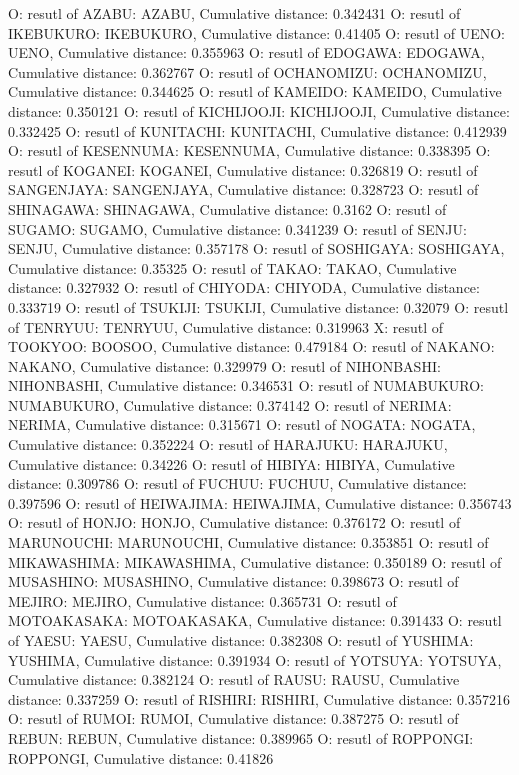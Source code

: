 O: resutl of AZABU: AZABU, Cumulative distance: 0.342431
O: resutl of IKEBUKURO: IKEBUKURO, Cumulative distance: 0.41405
O: resutl of UENO: UENO, Cumulative distance: 0.355963
O: resutl of EDOGAWA: EDOGAWA, Cumulative distance: 0.362767
O: resutl of OCHANOMIZU: OCHANOMIZU, Cumulative distance: 0.344625
O: resutl of KAMEIDO: KAMEIDO, Cumulative distance: 0.350121
O: resutl of KICHIJOOJI: KICHIJOOJI, Cumulative distance: 0.332425
O: resutl of KUNITACHI: KUNITACHI, Cumulative distance: 0.412939
O: resutl of KESENNUMA: KESENNUMA, Cumulative distance: 0.338395
O: resutl of KOGANEI: KOGANEI, Cumulative distance: 0.326819
O: resutl of SANGENJAYA: SANGENJAYA, Cumulative distance: 0.328723
O: resutl of SHINAGAWA: SHINAGAWA, Cumulative distance: 0.3162
O: resutl of SUGAMO: SUGAMO, Cumulative distance: 0.341239
O: resutl of SENJU: SENJU, Cumulative distance: 0.357178
O: resutl of SOSHIGAYA: SOSHIGAYA, Cumulative distance: 0.35325
O: resutl of TAKAO: TAKAO, Cumulative distance: 0.327932
O: resutl of CHIYODA: CHIYODA, Cumulative distance: 0.333719
O: resutl of TSUKIJI: TSUKIJI, Cumulative distance: 0.32079
O: resutl of TENRYUU: TENRYUU, Cumulative distance: 0.319963
X: resutl of TOOKYOO: BOOSOO, Cumulative distance: 0.479184
O: resutl of NAKANO: NAKANO, Cumulative distance: 0.329979
O: resutl of NIHONBASHI: NIHONBASHI, Cumulative distance: 0.346531
O: resutl of NUMABUKURO: NUMABUKURO, Cumulative distance: 0.374142
O: resutl of NERIMA: NERIMA, Cumulative distance: 0.315671
O: resutl of NOGATA: NOGATA, Cumulative distance: 0.352224
O: resutl of HARAJUKU: HARAJUKU, Cumulative distance: 0.34226
O: resutl of HIBIYA: HIBIYA, Cumulative distance: 0.309786
O: resutl of FUCHUU: FUCHUU, Cumulative distance: 0.397596
O: resutl of HEIWAJIMA: HEIWAJIMA, Cumulative distance: 0.356743
O: resutl of HONJO: HONJO, Cumulative distance: 0.376172
O: resutl of MARUNOUCHI: MARUNOUCHI, Cumulative distance: 0.353851
O: resutl of MIKAWASHIMA: MIKAWASHIMA, Cumulative distance: 0.350189
O: resutl of MUSASHINO: MUSASHINO, Cumulative distance: 0.398673
O: resutl of MEJIRO: MEJIRO, Cumulative distance: 0.365731
O: resutl of MOTOAKASAKA: MOTOAKASAKA, Cumulative distance: 0.391433
O: resutl of YAESU: YAESU, Cumulative distance: 0.382308
O: resutl of YUSHIMA: YUSHIMA, Cumulative distance: 0.391934
O: resutl of YOTSUYA: YOTSUYA, Cumulative distance: 0.382124
O: resutl of RAUSU: RAUSU, Cumulative distance: 0.337259
O: resutl of RISHIRI: RISHIRI, Cumulative distance: 0.357216
O: resutl of RUMOI: RUMOI, Cumulative distance: 0.387275
O: resutl of REBUN: REBUN, Cumulative distance: 0.389965
O: resutl of ROPPONGI: ROPPONGI, Cumulative distance: 0.41826
